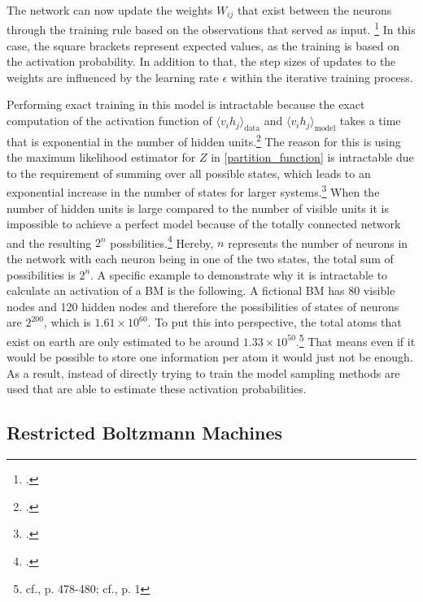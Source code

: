 The network can now update the weights \( W_{ij}\) that exist between the neurons through the training rule based on the observations that served as input. \footcite[cf.][1-2]{barraEquivalenceHopfieldNetworks2012}
In this case, the square brackets represent expected values, as the training is based on the activation probability.
In addition to that, the step sizes of updates to the weights are influenced by the learning rate \(\epsilon\) within the iterative training process.

Performing exact training in this model is intractable because the exact computation of the activation function of \(\langle v_i h_j \rangle_{\text{data}}\) and \(\langle v_i h_j \rangle_{\text{model}}\) takes a time that is exponential in the number of hidden units.\footcite[cf.][449]{salakhutdinovDeepBoltzmannMachines2009}
The reason for this is using the maximum likelihood estimator for \( Z \) in \eqref{partition_function} is intractable due to the requirement of summing over all possible states, which leads to an exponential increase in the number of states for larger systems.\footcite[cf.][2-3]{zhaiDeepStructuredEnergy2016}
When the number of hidden units is large compared to the number of visible units it is impossible to achieve a perfect model because of the totally connected network and the resulting \( 2^n \) possbilities.\footcite[cf.][154]{ackleyLearningAlgorithmBoltzmann1985}
Hereby, \( n\) represents the number of neurons in the network with each neuron being in one of the two states, the total sum of possibilities is \( 2^n \).
A specific example to demonstrate why it is intractable to calculate an activation of a \ac{BM} is the following. A fictional \ac{BM} has 80 visible nodes and 120 hidden nodes and therefore the possibilities of states of neurons are \( 2^{200} \), which is \( 1.61 \times 10^{60}\). 
To put this into perspective, the total atoms that exist on earth are only estimated to be around \( 1.33 \times 10^{50}\).\footnote{cf.\cite{helmenstineHowManyAtoms2022}, p. 478-480; cf.\cite{schlammingerCoolWayMeasure2014}, p. 1}
That means even if it would be possible to store one information per atom it would just not be enough. 
As a result, instead of directly trying to train the model sampling methods are used that are able to estimate these activation probabilities.

\subsection{Restricted Boltzmann Machines}

